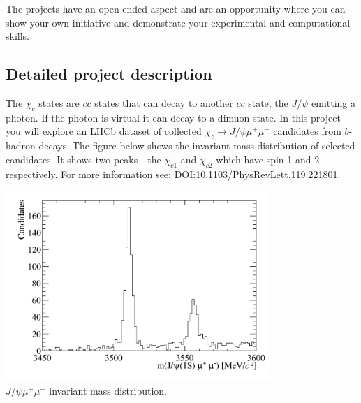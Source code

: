 The projects have an open-ended aspect and are an opportunity where you can show your own initiative and demonstrate your experimental and computational skills.




\subsection{Detailed project description}

The $\chi_c$ states are $c\overline{c}$ states that can decay to another $c\overline{c}$ state, the  $J/\psi$ emitting a photon. If the photon is virtual it can decay to a dimuon state. 
In this project you will explore an LHCb dataset of collected $\chi_c \rightarrow J/\psi \mu^+ \mu^-$ candidates from $b$-hadron decays. The figure below shows the invariant mass distribution of selected candidates. It shows two peaks - the $\chi_{c1}$ and $\chi_{c2}$ which have spin 1 and 2 respectively.
For more information see: {DOI:10.1103/PhysRevLett.119.221801}. 
%
\begin{center}
\includegraphics[width=0.75\textwidth]{figs/jmm.pdf}\\
{\small $J/\psi \mu^+ \mu^-$ invariant mass distribution.}
\end{center}
%

